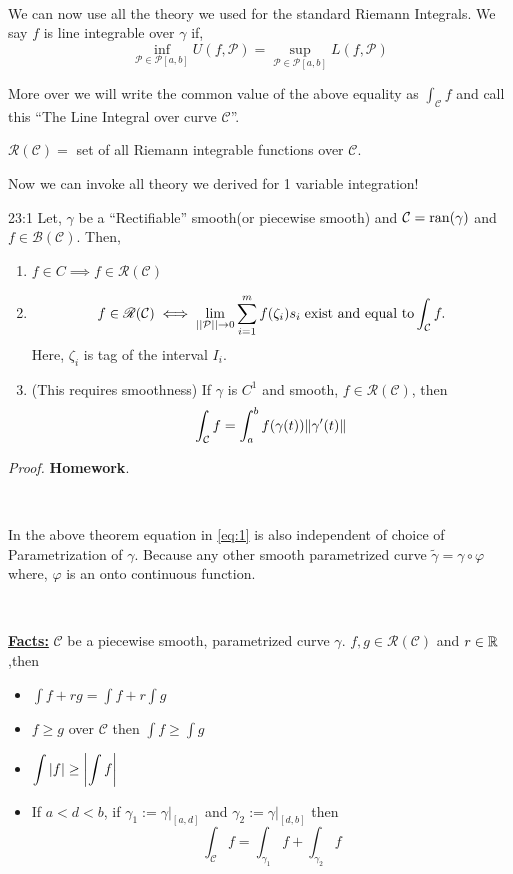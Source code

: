 \documentclass[../Analysis-3]{subfiles}
\begin{document}
\

We can now use all the theory we used for the standard Riemann Integrals. We say $f$ is line integrable over $\gamma$ if,
\[\inf_{\mathcal{P} \in \mathscr{P}[a,b]} U(f,\mathcal{P}) = \sup_{\mathcal{P} \in \mathscr{P}[a,b]} L(f,\mathcal{P})\]

More over we will write the common value of the above equality as $\displaystyle\int_{\mathcal{C}} f$ and call this ``The Line Integral over curve $\mathcal{C}$''.

\begin{notnBox}
    $\mathscr{R}(\mathcal{C}) = $ set of all Riemann integrable functions over $\mathcal{C}$.
\end{notnBox}

Now we can invoke all theory we derived for 1 variable integration!

\begin{Thm}{}{23:1}
    Let, $\gamma$ be a ``Rectifiable'' smooth(or piecewise smooth) and $\mathcal{C} = \operatorname{ran}(\gamma)$ and $f \in \mathscr{B}(\mathcal{C})$. Then,
    \begin{enumerate}
        \item $f \in C \implies f \in \mathscr{R}(\mathcal{C})$
        \item \[ f \in \mathscr{R}(\mathcal{C}) \iff \lim_{||\mathcal{P}||\to 0} \sum_{i=1}^{m} f(\zeta_i)s_i \hspace{0.1cm} \text{exist and equal to}\int_{\mathcal{C}} f.\] Here, $\zeta_i$ is tag of the interval $I_i$.

        \item (This requires smoothness) If $\gamma$ is $C^1$ and smooth, $f \in \mathscr{R}(\mathcal{C})$, then
              \[\int_{\mathcal{C}} f = \int_a^b f(\gamma(t))\norm{\gamma'(t)} \label{eq:1}\]

    \end{enumerate}
\end{Thm}

\textit{Proof.} \textbf{Homework}.

\

In the above theorem equation in \ref{eq:1} is also independent of choice of Parametrization of $\gamma$. Because any other smooth parametrized curve $\tilde{\gamma} = \gamma \circ \varphi$ where, $\varphi$ is an onto continuous function.

\

\textbf{\underline{Facts:}} $\mathcal{C}$ be a piecewise smooth, parametrized curve $\gamma$. $f,g \in \mathscr{R}(\mathcal{C})$ and $r \in \mathbb{R}$,then
\begin{itemize}
    \item $\displaystyle\int f+rg = \displaystyle\int f + r\displaystyle\int g $
    \item $f \ge g$ over $\mathcal{C}$ then $\displaystyle\int f \ge \displaystyle\int g$
    \item $\displaystyle\int \abs{f} \ge \abs{\displaystyle\int f}$
    \item If $a<d<b$, if $\gamma_1 := \gamma |_{[a,d]}$ and $\gamma_2 := \gamma |_{[d,b]}$ then
          \[\int_{\mathcal{C}} f = \int_{\gamma_1}f + \int_{\gamma_2} f \]
\end{itemize}
\end{document}
